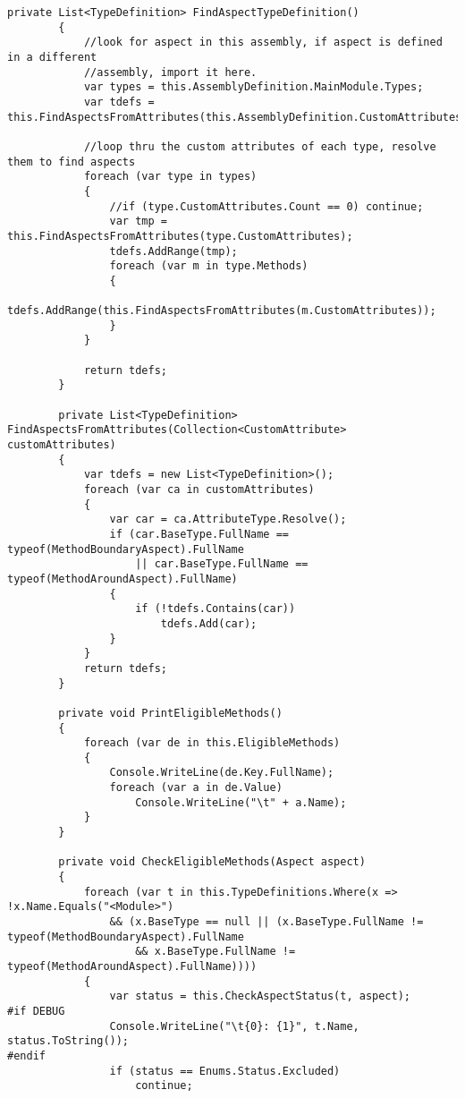 \begin{lstlisting}[caption={../buffalo/Weaver.cs}, label=../buffalo/Weaver.cs, frame=tb, basicstyle=\scriptsize]
        private List<TypeDefinition> FindAspectTypeDefinition()
        {
            //look for aspect in this assembly, if aspect is defined in a different
            //assembly, import it here.
            var types = this.AssemblyDefinition.MainModule.Types;
            var tdefs = this.FindAspectsFromAttributes(this.AssemblyDefinition.CustomAttributes);

            //loop thru the custom attributes of each type, resolve them to find aspects
            foreach (var type in types)
            {
                //if (type.CustomAttributes.Count == 0) continue;
                var tmp = this.FindAspectsFromAttributes(type.CustomAttributes);
                tdefs.AddRange(tmp);
                foreach (var m in type.Methods)
                {
                    tdefs.AddRange(this.FindAspectsFromAttributes(m.CustomAttributes));
                }
            }

            return tdefs;
        }

        private List<TypeDefinition> FindAspectsFromAttributes(Collection<CustomAttribute> customAttributes)
        {
            var tdefs = new List<TypeDefinition>();
            foreach (var ca in customAttributes)
            {
                var car = ca.AttributeType.Resolve();
                if (car.BaseType.FullName == typeof(MethodBoundaryAspect).FullName
                    || car.BaseType.FullName == typeof(MethodAroundAspect).FullName)
                {
                    if (!tdefs.Contains(car))
                        tdefs.Add(car);
                }
            }
            return tdefs;
        }

        private void PrintEligibleMethods()
        {
            foreach (var de in this.EligibleMethods)
            {
                Console.WriteLine(de.Key.FullName);
                foreach (var a in de.Value)
                    Console.WriteLine("\t" + a.Name);
            }
        }

        private void CheckEligibleMethods(Aspect aspect)
        {
            foreach (var t in this.TypeDefinitions.Where(x => !x.Name.Equals("<Module>")
                && (x.BaseType == null || (x.BaseType.FullName != typeof(MethodBoundaryAspect).FullName
                    && x.BaseType.FullName != typeof(MethodAroundAspect).FullName))))
            {
                var status = this.CheckAspectStatus(t, aspect);
#if DEBUG
                Console.WriteLine("\t{0}: {1}", t.Name, status.ToString());
#endif
                if (status == Enums.Status.Excluded)
                    continue;


\end{lstlisting}
